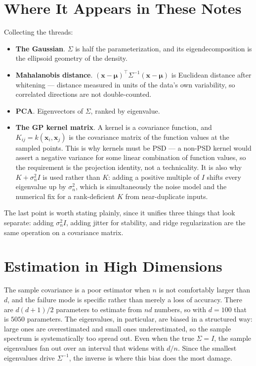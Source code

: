 \documentclass[conference]{IEEEtran}
\begin{document}
\section*{Where It Appears in These Notes}
Collecting the threads:
\begin{itemize}
    \item \textbf{The Gaussian}. $\Sigma$ is half the parameterization, and its eigendecomposition is the ellipsoid geometry of the density.
    \item \textbf{Mahalanobis distance}. $(\mathbf{x}-\boldsymbol{\mu})^{\!\top}\Sigma^{-1}(\mathbf{x}-\boldsymbol{\mu})$ is Euclidean distance after whitening --- distance measured in units of the data's own variability, so correlated directions are not double-counted.
    \item \textbf{PCA}. Eigenvectors of $\Sigma$, ranked by eigenvalue.
    \item \textbf{The GP kernel matrix}. A kernel is a covariance function, and $K_{ij} = k(\mathbf{x}_i,\mathbf{x}_j)$ is the covariance matrix of the function values at the sampled points. This is why kernels must be PSD --- a non-PSD kernel would assert a negative variance for some linear combination of function values, so the requirement is the projection identity, not a technicality. It is also why $K + \sigma_n^2 I$ is used rather than $K$: adding a positive multiple of $I$ shifts every eigenvalue up by $\sigma_n^2$, which is simultaneously the noise model and the numerical fix for a rank-deficient $K$ from near-duplicate inputs.
\end{itemize}
The last point is worth stating plainly, since it unifies three things that look separate: adding $\sigma_n^2 I$, adding jitter for stability, and ridge regularization are the same operation on a covariance matrix.

\section*{Estimation in High Dimensions}
The sample covariance is a poor estimator when $n$ is not comfortably larger than $d$, and the failure mode is specific rather than merely a loss of accuracy. There are $d(d+1)/2$ parameters to estimate from $nd$ numbers, so with $d = 100$ that is $5050$ parameters. The eigenvalues, in particular, are biased in a structured way: large ones are overestimated and small ones underestimated, so the sample spectrum is systematically too spread out. Even when the true $\Sigma = I$, the sample eigenvalues fan out over an interval that widens with $d/n$. Since the smallest eigenvalues drive $\Sigma^{-1}$, the inverse is where this bias does the most damage.
\end{document}
